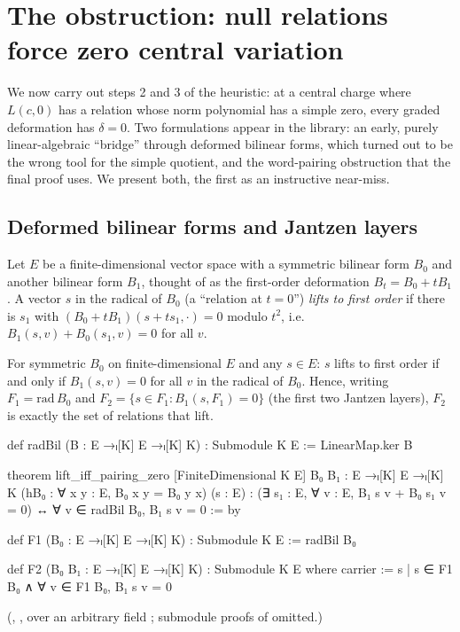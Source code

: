 \section{The obstruction: null relations force zero central variation}\label{l07:sec:obstruction}

We now carry out steps 2 and 3 of the heuristic: at a central charge where $L(c,0)$ has a relation
whose norm polynomial has a simple zero, every graded deformation has $\delta = 0$. Two formulations
appear in the library: an early, purely linear-algebraic ``bridge'' through deformed bilinear forms,
which turned out to be the wrong tool for the simple quotient, and the word-pairing obstruction that
the final proof uses. We present both, the first as an instructive near-miss.

\subsection{Deformed bilinear forms and Jantzen layers}

Let $E$ be a finite-dimensional vector space with a symmetric bilinear form $B_0$ and another bilinear
form $B_1$, thought of as the first-order deformation $B_t = B_0+tB_1$. A vector $s$ in the radical of
$B_0$ (a ``relation at $t = 0$'') \emph{lifts to first order} if there is $s_1$ with
$(B_0+tB_1)(s+ts_1,\cdot) = 0$ modulo $t^2$, i.e.\ $B_1(s,v) + B_0(s_1,v) = 0$ for all $v$.

\begin{proposition}\label{l07:prop:lift}
For symmetric $B_0$ on finite-dimensional $E$ and any $s\in E$: $s$ lifts to first order if and only if
$B_1(s,v) = 0$ for all $v$ in the radical of $B_0$. Hence, writing $F_1 = \mathrm{rad}\,B_0$ and
$F_2 = \{s\in F_1 : B_1(s,F_1) = 0\}$ (the first two Jantzen layers), $F_2$ is exactly the set of
relations that lift.
\end{proposition}
\begin{leancode}
def radBil (B : E →ₗ[K] E →ₗ[K] K) : Submodule K E := LinearMap.ker B

theorem lift_iff_pairing_zero [FiniteDimensional K E] {B₀ B₁ : E →ₗ[K] E →ₗ[K] K}
    (hB₀ : ∀ x y : E, B₀ x y = B₀ y x) (s : E) :
    (∃ s₁ : E, ∀ v : E, B₁ s v + B₀ s₁ v = 0) ↔ ∀ v ∈ radBil B₀, B₁ s v = 0 := by

def F1 (B₀ : E →ₗ[K] E →ₗ[K] K) : Submodule K E := radBil B₀

def F2 (B₀ B₁ : E →ₗ[K] E →ₗ[K] K) : Submodule K E where
  carrier := {s | s ∈ F1 B₀ ∧ ∀ v ∈ F1 B₀, B₁ s v = 0}
\end{leancode}
(, , over an arbitrary field
; submodule proofs of  omitted.)

